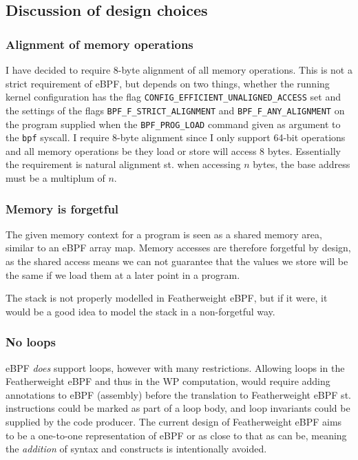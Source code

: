 \subsection{Discussion of design choices}
\label{subsec:discussion_of_design_choices}



\subsubsection*{Alignment of memory operations}

I have decided to require 8-byte alignment of all memory operations. This is not a strict requirement of eBPF, but depends on two things, whether the running kernel configuration has the flag \texttt{CONFIG\_EFFICIENT\_UNALIGNED\_ACCESS} set and the settings of the flags \texttt{BPF\_F\_STRICT\_ALIGNMENT} and \texttt{BPF\_F\_ANY\_ALIGNMENT} on the program supplied when the \texttt{BPF\_PROG\_LOAD} command given as argument to the \texttt{bpf} syscall.
I require 8-byte alignment since I only support 64-bit operations and all memory operations be they load or store will access 8 bytes. Essentially the requirement is natural alignment st. when accessing $n$ bytes, the base address must be a multiplum of $n$. 

\subsubsection*{Memory is forgetful}

The given memory context for a program is seen as a shared memory area, similar to an eBPF array map. Memory accesses are therefore forgetful by design, as the shared access means we can not guarantee that the values we store will be the same if we load them at a later point in a program.

The stack is not properly modelled in Featherweight eBPF, but if it were, it would be a good idea to model the stack in a non-forgetful way. 

\subsubsection*{No loops}
eBPF \textit{does} support loops, however with many restrictions. Allowing loops in the Featherweight eBPF and thus in the WP computation, would require adding annotations to eBPF (assembly) before the translation to Featherweight eBPF st. instructions could be marked as part of a loop body, and loop invariants could be supplied by the code producer. The current design of Featherweight eBPF aims to be a one-to-one representation of eBPF or as close to that as can be, meaning the \textit{addition} of syntax and constructs is intentionally avoided. 


